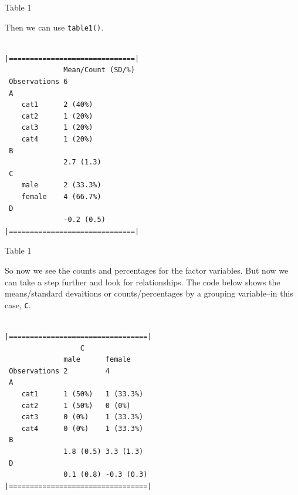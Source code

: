 \begin{frame}[fragile]{Table 1}

Then we can use \texttt{table1()}.

\begin{Shaded}
\begin{Highlighting}[]
\end{Highlighting}
\end{Shaded}

\begin{verbatim}

|==============================|
              Mean/Count (SD/%)
 Observations 6                
 A                             
    cat1      2 (40%)          
    cat2      1 (20%)          
    cat3      1 (20%)          
    cat4      1 (20%)          
 B                             
              2.7 (1.3)        
 C                             
    male      2 (33.3%)        
    female    4 (66.7%)        
 D                             
              -0.2 (0.5)       
|==============================|
\end{verbatim}

\end{frame}

\begin{frame}[fragile]{Table 1}

So now we see the counts and percentages for the factor variables. But
now we can take a step further and look for relationships. The code
below shows the means/standard devaitions or counts/percentages by a
grouping variable--in this case, \texttt{C}.

\begin{Shaded}
\begin{Highlighting}[]
        \OperatorTok{~}
\end{Highlighting}
\end{Shaded}

\begin{verbatim}

|=================================|
                  C 
              male      female    
 Observations 2         4         
 A                                
    cat1      1 (50%)   1 (33.3%) 
    cat2      1 (50%)   0 (0%)    
    cat3      0 (0%)    1 (33.3%) 
    cat4      0 (0%)    1 (33.3%) 
 B                                
              1.8 (0.5) 3.3 (1.3) 
 D                                
              0.1 (0.8) -0.3 (0.3)
|=================================|
\end{verbatim}

\end{frame}

